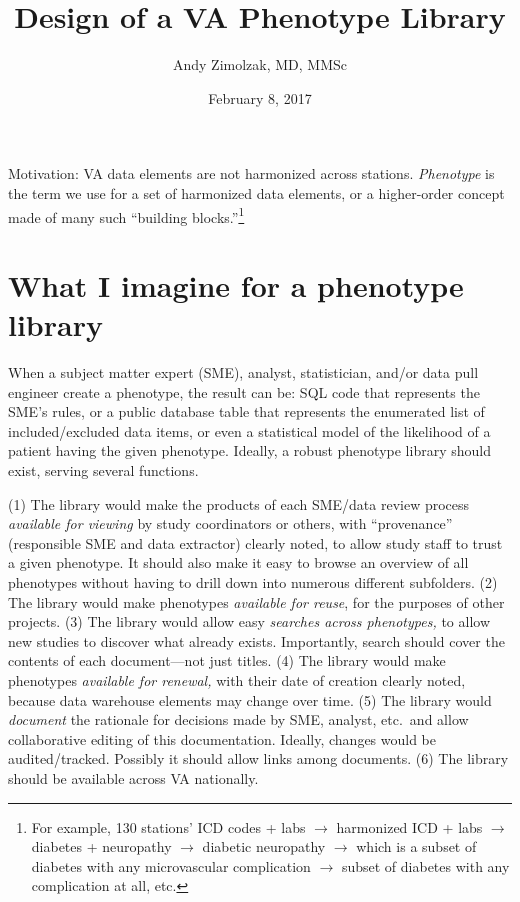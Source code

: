 \documentclass{tufte-handout}
\title{Design of a VA Phenotype Library}
\author{Andy Zimolzak, MD, MMSc}
\date{February 8, 2017}
\begin{document}
\maketitle

Motivation: VA data elements are not harmonized across stations.
\emph{Phenotype} is the term we use for a set of harmonized data
elements, or a higher-order concept made of many such ``building
blocks.''\footnote{For example, 130 stations' ICD codes + labs $\to$
  harmonized ICD + labs $\to$ diabetes + neuropathy $\to$ diabetic
  neuropathy $\to$ which is a subset of diabetes with any
  microvascular complication $\to$ subset of diabetes with any
  complication at all, etc.}

\section{What I imagine for a phenotype library}

When a subject matter expert (SME), analyst, statistician, and/or data
pull engineer create a phenotype, the result can be: SQL code that
represents the SME's rules, or a public database table that represents
the enumerated list of included/excluded data items, or even a
statistical model of the likelihood of a patient having the given
phenotype. Ideally, a robust phenotype library should exist, serving
several functions.

(1) The library would make the products of each SME/data review
process \emph{available for viewing} by study coordinators or others,
with ``provenance'' (responsible SME and data extractor) clearly
noted, to allow study staff to trust a given phenotype. It should also
make it easy to browse an overview of all phenotypes without having to
drill down into numerous different subfolders. (2) The library would
make phenotypes \emph{available for reuse}, for the purposes of other
projects. (3) The library would allow easy \emph{searches across
  phenotypes,} to allow new studies to discover what already exists.
Importantly, search should cover the contents of each document---not
just titles. (4) The library would make phenotypes \emph{available for
  renewal,} with their date of creation clearly noted, because data
warehouse elements may change over time. (5) The library would
\emph{document} the rationale for decisions made by SME, analyst,
etc.\ and allow collaborative editing of this documentation. Ideally,
changes would be audited/tracked. Possibly it should allow links among
documents. (6) The library should be available across VA nationally.
\end{document}
